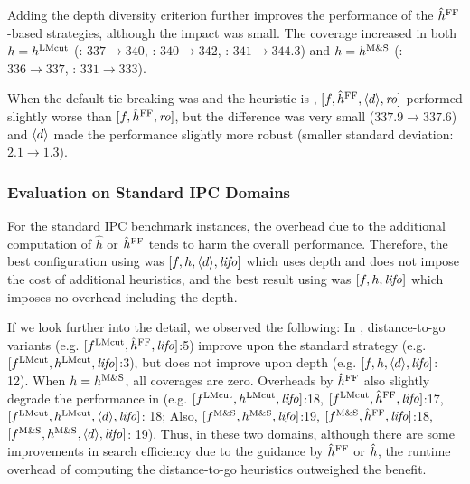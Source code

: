 Adding the depth diversity criterion further improves the performance of the $\hat{h}^{\text{FF}}$-based strategies,
 although the impact was small.
The coverage increased in both
 $h=h^\text{LMcut}$ (\fifo: $337\rightarrow 340$, \lifo: $340\rightarrow 342$, \ro: $341\rightarrow 344.3$) and
 $h=h^\text{M\&S}$ (\fifo: $336\rightarrow 337$, \lifo: $331\rightarrow 333$).
\begin{comment}
 Improvement was observed in the following domains:
\begin{itemize}
 \item \textbf{\lmcut}: \pddl{mprime-succumb} (\lifo, \ro), \pddl{storage-lift} (\ro), \pddl{tidybot-motion} (\fifo), \pddl{tpp-fuel} (\fifo, \ro). (See \reftbl{tbl:dtg-lmcut-zero}.)
 \item \textbf{\mands}: \pddl{mprime-succumb} (\lifo, \ro), \pddl{tpp-fuel} (\fifo). (See \reftbl{tbl:dtg-mands-zero}.)
\end{itemize}
\end{comment}
% 
When the default tie-breaking was \ro and the heuristic is \mands, $[f,\hat{h}^{\text{FF}},{\left<d\right>},{\text{\textit{ro}}}]$ performed slightly worse than 
$[f,\hat{h}^{\text{FF}},{\text{\textit{ro}}}]$, but the difference was very small  ($337.9\rightarrow 337.6$) and ${\left<d\right>}$ made the performance slightly more robust (smaller standard deviation: $2.1\rightarrow 1.3$).

\subsubsection{Evaluation on Standard IPC Domains}

For the standard IPC benchmark instances, the overhead due to the additional computation of
$\hat{h}$ or $\hat{h}^{\text{FF}}$ tends to harm the overall performance.
Therefore, the best configuration using \lmcut was
$[f,h,{\left<d\right>},{\text{\textit{lifo}}}]$ which uses depth and does not impose the cost of
additional heuristics, and the best result using \mands
was $[f,h,{\text{\textit{lifo}}}]$ which imposes no overhead including the depth.

If we look further into the detail, we observed the following:
In , distance-to-go variants (e.g. $[f^\text{LMcut},\hat{h}^{\text{FF}},{\text{\textit{lifo}}}]$:5) improve upon the standard strategy (e.g. $[f^\text{LMcut},h^\text{LMcut},{\text{\textit{lifo}}}]$:3), but does not improve upon depth (e.g. $[f,h,{\left<d\right>},{\text{\textit{lifo}}}]$: 12). When $h=h^\text{M\&S}$, all coverages are zero. Overheads by $\hat{h}^{\text{FF}}$ also slightly degrade the performance in  (e.g. $[f^\text{LMcut},h^\text{LMcut},{\text{\textit{lifo}}}]$:18, $[f^\text{LMcut},\hat{h}^{\text{FF}},{\text{\textit{lifo}}}]$:17, $[f^\text{LMcut},h^\text{LMcut},{\left<d\right>},{\text{\textit{lifo}}}]$: 18; Also, $[f^\text{M\&S},h^\text{M\&S},{\text{\textit{lifo}}}]$:19, $[f^\text{M\&S},\hat{h}^{\text{FF}},{\text{\textit{lifo}}}]$:18, $[f^\text{M\&S},h^\text{M\&S},{\left<d\right>},{\text{\textit{lifo}}}]$: 19). Thus, in these two domains, although there are some improvements in search efficiency due to the guidance by $\hat{h}^{\text{FF}}$ or $\hat{h}$, the runtime overhead of computing the  distance-to-go heuristics outweighed the benefit.
 
